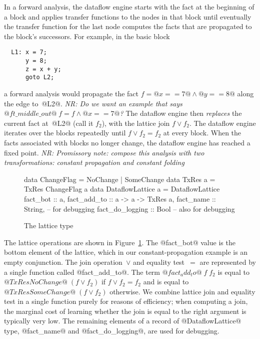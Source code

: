 \documentclass[blockstyle,preprint,nocopyrightspace]{sigplanconf}
\newcommand{\authornote}[1]{{\em #1}}
\newcommand{\norman}[1]{\authornote{NR: #1}}
\let\remark\norman
\newcommand\figref[1]{Figure~\ref{fig:#1}}
\newcommand\figlabel[1]{\label{fig:#1}}
\begin{document}
In a forward analysis, the dataflow engine starts with the fact at the
beginning of a block and applies transfer functions to the nodes in
that block until eventually the transfer function for the last node
computes the facts that are propagated to the block's successors.
For example, in the basic block
\begin{verbatim}
  L1: x = 7;
      y = 8;
      z = x + y;
      goto L2;
\end{verbatim}
a forward analysis would propagate the fact 
$f = @x == 7@ \land @y == 8@$ along the edge to~@L2@.
\remark{Do we want an example that says 
$@ft\_middle\_out@\;f = f \land @x == 7@$?}
The dataflow engine then \emph{replaces} the current fact at~@L2@
(call it $f_2$), with the lattice join $f \vee f_2$.
The dataflow engine iterates over the blocks repeatedly until
$f \vee f_2 = f_2$ at every block.
When the facts associated with blocks no longer change, the dataflow
engine has reached a fixed point.
\remark{Promissory note: compose this analysis with two
transformations: constant propagation and constant folding}


\begin{figure}
\begin{code}
data ChangeFlag = NoChange | SomeChange
data TxRes a    = TxRes ChangeFlag a
data DataflowLattice a = DataflowLattice
 {fact_bot        :: a,
  fact_add_to     :: a -> a -> TxRes a,
  fact_name       :: String, -- for debugging
  fact_do_logging :: Bool}   -- also for debugging
\end{code}
\caption{The lattice type} \figlabel{lattice-type} \figlabel{lattice}
\end{figure}

The lattice operations are shown in \figref{lattice}.
The @fact_bot@ value is the bottom element of the
lattice, which in our constant-propagation example is an empty
conjunction.
The join operation~$\vee$ and equality test~$=$ are represented by a
single function called @fact_add_to@.
The term $@fact_add_to@\;f\;f_2$ is equal to
$@TxRes NoChange@\; (f \vee f_2)$ if $f \vee f_2 = f_2$
and is equal to
$@TxRes SomeChange@\; (f \vee f_2)$ otherwise.
We combine lattice join and equality test in a single function purely
for reasons of efficiency;
when computing a join, the marginal cost of learning whether the join
is equal to the right argument is typically very low.
%
The remaining elements of a record of @DataflowLattice@ type,
@fact_name@ 
and @fact_do_logging@,
 are used
for debugging.
\end{document}
